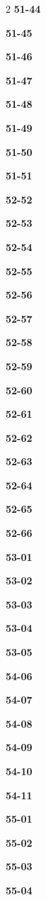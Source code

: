 \documentclass[10pt,a4paper]{article}
\begin{document}
\begin{multicols}{2}
\noindent\textbf{51-44}\ \par
\noindent\textbf{51-45}\ \par
\noindent\textbf{51-46}\ \par
\noindent\textbf{51-47}\ \par
\noindent\textbf{51-48}\ \par
\noindent\textbf{51-49}\ \par
\noindent\textbf{51-50}\ \par
\noindent\textbf{51-51}\ \par
\noindent\textbf{52-52}\ \par
\noindent\textbf{52-53}\ \par
\noindent\textbf{52-54}\ \par
\noindent\textbf{52-55}\ \par
\noindent\textbf{52-56}\ \par
\noindent\textbf{52-57}\ \par
\noindent\textbf{52-58}\ \par
\noindent\textbf{52-59}\ \par
\noindent\textbf{52-60}\ \par
\noindent\textbf{52-61}\ \par
\noindent\textbf{52-62}\ \par
\noindent\textbf{52-63}\ \par
\noindent\textbf{52-64}\ \par
\noindent\textbf{52-65}\ \par
\noindent\textbf{52-66}\ \par
\noindent\textbf{53-01}\ \par
\noindent\textbf{53-02}\ \par
\noindent\textbf{53-03}\ \par
\noindent\textbf{53-04}\ \par
\noindent\textbf{53-05}\ \par
\noindent\textbf{54-06}\ \par
\noindent\textbf{54-07}\ \par
\noindent\textbf{54-08}\ \par
\noindent\textbf{54-09}\ \par
\noindent\textbf{54-10}\ \par
\noindent\textbf{54-11}\ \par
\noindent\textbf{55-01}\ \par
\noindent\textbf{55-02}\ \par
\noindent\textbf{55-03}\ \par
\noindent\textbf{55-04}\ \par

\end{multicols}
\end{document}
